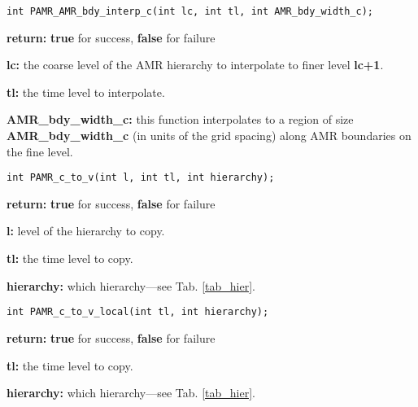 \documentclass[aps,amssymb,unsortedaddress,nofootinbib]{revtex4}
\def\lsep{\itemsep 0.05in}
\begin{document}

\begin{verbatim}
int PAMR_AMR_bdy_interp_c(int lc, int tl, int AMR_bdy_width_c);
\end{verbatim}
\begin{list}{}{\lsep}
\item {\bf return:} {\bf true} for success, {\bf false} for failure
\item {\bf lc:} the coarse level of the AMR hierarchy to interpolate to finer level {\bf lc+1}.
\item {\bf tl:} the time level to interpolate.
\item {\bf AMR\_bdy\_width\_c:} this function interpolates to a region of size {\bf AMR\_bdy\_width\_c}
                             (in units of the grid spacing) along AMR boundaries on the fine level.
\end{list}



\begin{verbatim}
int PAMR_c_to_v(int l, int tl, int hierarchy);
\end{verbatim}
\begin{list}{}{\lsep}
\item {\bf return:} {\bf true} for success, {\bf false} for failure
\item {\bf l:} level of the hierarchy to copy.
\item {\bf tl:} the time level to copy.
\item {\bf hierarchy:} which hierarchy---see Tab. \ref{tab_hier}.
\end{list}


\begin{verbatim}
int PAMR_c_to_v_local(int tl, int hierarchy);
\end{verbatim}
\begin{list}{}{\lsep}
\item {\bf return:} {\bf true} for success, {\bf false} for failure
\item {\bf tl:} the time level to copy.
\item {\bf hierarchy:} which hierarchy---see Tab. \ref{tab_hier}.
\end{list}

\end{document}
